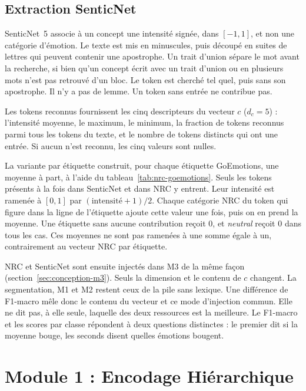 \subsection{Extraction SenticNet}

SenticNet~5 \cite{cambria2018senticnet} associe à un concept une
intensité signée, dans $[-1, 1]$, et non une catégorie d'émotion. Le
texte est mis en minuscules, puis découpé en suites de lettres qui
peuvent contenir une apostrophe. Un trait d'union sépare le mot avant
la recherche, si bien qu'un concept écrit avec un trait d'union ou en
plusieurs mots n'est pas retrouvé d'un bloc. Le token est cherché tel
quel, puis sans son apostrophe. Il n'y a pas de lemme. Un token sans
entrée ne contribue pas.

Les tokens reconnus fournissent les cinq descripteurs du vecteur $c$
($d_c{=}5$) : l'intensité moyenne, le maximum, le minimum, la fraction
de tokens reconnus parmi tous les tokens du texte, et le nombre de
tokens distincts qui ont une entrée. Si aucun n'est reconnu, les cinq
valeurs sont nulles.

La variante par étiquette construit, pour chaque étiquette GoEmotions,
une moyenne à part, à l'aide du tableau~\ref{tab:nrc-goemotions}. Seuls
les tokens présents à la fois dans SenticNet et dans NRC y entrent.
Leur intensité est ramenée à $[0, 1]$ par $(\mathrm{intensité}+1)/2$.
Chaque catégorie NRC du token qui figure dans la ligne de l'étiquette
ajoute cette valeur une fois, puis on en prend la moyenne. Une
étiquette sans aucune contribution reçoit $0$, et \emph{neutral} reçoit
$0$ dans tous les cas. Ces moyennes ne sont pas ramenées à une somme
égale à un, contrairement au vecteur NRC par étiquette.

NRC et SenticNet sont ensuite injectés dans M3 de la même façon
(section~\ref{sec:conception-m3}). Seuls la dimension et le contenu de
$c$ changent. La segmentation, M1 et M2 restent ceux de la pile sans
lexique. Une différence de F1-macro mêle donc le contenu du vecteur et
ce mode d'injection commun. Elle ne dit pas, à elle seule, laquelle des
deux ressources est la meilleure. Le F1-macro et les scores par classe
répondent à deux questions distinctes : le premier dit si la moyenne
bouge, les seconds disent quelles émotions bougent.

\section{Module 1 : Encodage Hiérarchique}
\label{sec:conception-m1}

